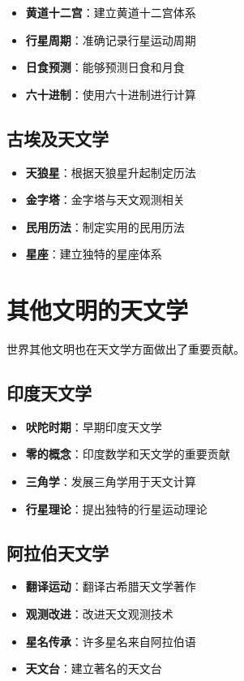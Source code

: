\documentclass[12pt,UTF8]{ctexbook}
\begin{document}
\begin{itemize}
  \item \textbf{黄道十二宫}：建立黄道十二宫体系
  \item \textbf{行星周期}：准确记录行星运动周期
  \item \textbf{日食预测}：能够预测日食和月食
  \item \textbf{六十进制}：使用六十进制进行计算
\end{itemize}

\subsection{古埃及天文学}

\begin{itemize}
  \item \textbf{天狼星}：根据天狼星升起制定历法
  \item \textbf{金字塔}：金字塔与天文观测相关
  \item \textbf{民用历法}：制定实用的民用历法
  \item \textbf{星座}：建立独特的星座体系
\end{itemize}

\section{其他文明的天文学}

世界其他文明也在天文学方面做出了重要贡献。

\subsection{印度天文学}

\begin{itemize}
  \item \textbf{吠陀时期}：早期印度天文学
  \item \textbf{零的概念}：印度数学和天文学的重要贡献
  \item \textbf{三角学}：发展三角学用于天文计算
  \item \textbf{行星理论}：提出独特的行星运动理论
\end{itemize}

\subsection{阿拉伯天文学}

\begin{itemize}
  \item \textbf{翻译运动}：翻译古希腊天文学著作
  \item \textbf{观测改进}：改进天文观测技术
  \item \textbf{星名传承}：许多星名来自阿拉伯语
  \item \textbf{天文台}：建立著名的天文台
\end{itemize}
\end{document}
